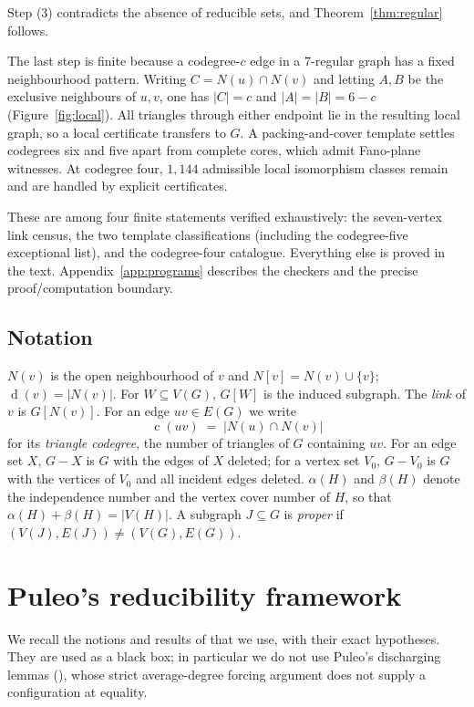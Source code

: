 \documentclass[11pt,a4paper]{amsart}
\theoremstyle{plain}
\theoremstyle{definition}
\newcommand{\cod}{\operatorname{c}}
\newcommand{\N}{N}
\newcommand{\dg}{\operatorname{d}}
\newcommand{\vc}{\beta}
\begin{document}
Step (3) contradicts the absence of reducible sets, and
Theorem~\ref{thm:regular} follows.

The last step is finite because a codegree-$c$ edge in a $7$-regular graph has
a fixed neighbourhood pattern. Writing $C=\N(u)\cap\N(v)$ and letting $A,B$
be the exclusive neighbours of $u,v$, one has $|C|=c$ and
$|A|=|B|=6-c$ (Figure~\ref{fig:local}). All triangles through either endpoint
lie in the resulting local graph, so a local certificate transfers to $G$.
A packing-and-cover template settles codegrees six and five apart from
complete cores, which admit Fano-plane witnesses. At codegree four, $1{,}144$
admissible local isomorphism classes remain and are handled by explicit
certificates.

These are among four finite statements verified exhaustively: the
seven-vertex link census, the two template classifications (including the
codegree-five exceptional list), and the codegree-four catalogue. Everything
else is proved in the text. Appendix~\ref{app:programs} describes the checkers
and the precise proof/computation boundary.

\subsection{Notation}

$\N(v)$ is the open neighbourhood of $v$ and $\N[v]=\N(v)\cup\{v\}$;
$\dg(v)=|\N(v)|$. For $W\subseteq V(G)$, $G[W]$ is the induced subgraph. The
\emph{link} of $v$ is $G[\N(v)]$. For an edge $uv\in E(G)$ we write
\[
  \cod(uv)\;=\;|\N(u)\cap \N(v)|
\]
for its \emph{triangle codegree}, the number of triangles of $G$ containing
$uv$. For an edge set $X$, $G-X$ is $G$ with the edges of $X$ deleted; for a
vertex set $V_0$, $G-V_0$ is $G$ with the vertices of $V_0$ and all incident
edges deleted. $\alpha(H)$ and $\vc(H)$ denote the independence number and the
vertex cover number of $H$, so that $\alpha(H)+\vc(H)=|V(H)|$. A subgraph
$J\subseteq G$ is \emph{proper} if $(V(J),E(J))\neq(V(G),E(G))$.

\section{Puleo's reducibility framework}\label{sec:prelim}

We recall the notions and results of \cite{Puleo2015} that we use, with their
exact hypotheses. They are used as a black box; in particular we do not use
Puleo's discharging lemmas (\cite[Lemmas 2.7, 2.8]{Puleo2015}), whose strict
average-degree forcing argument does not supply a configuration at equality.
\end{document}

